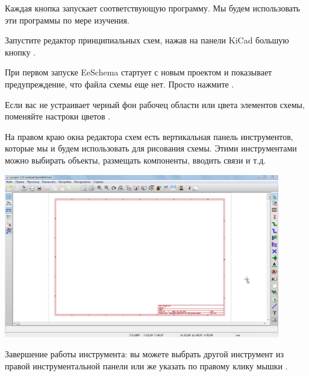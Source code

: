Каждая кнопка запускает соответствующую программу. Мы будем использовать эти
программы по мере изучения.


Запустите редактор принципиальных схем, нажав на панели KiCad большую кнопку
.

При первом запуске EeSchema стартует с новым проектом и показывает
предупреждение, что файла схемы еще нет. Просто нажмите .

Если вас не устраивает черный фон рабочец области или цвета элементов схемы,
поменяйте настроки цветов . 

На правом краю окна редактора схем есть вертикальная панель инструментов,
которые мы и будем использовать для рисования схемы. Этими инструментами можно
выбирать объекты, размещать компоненты, вводить связи и т.д.

\includegraphics[width=0.9\textwidth]{kicad/ee15.png}

Завершение работы инструмента: вы можете выбрать другой инструмент из правой
инструментальной панели или же указать  по правому
клику мышки \keys{\rms}.

\secdown


